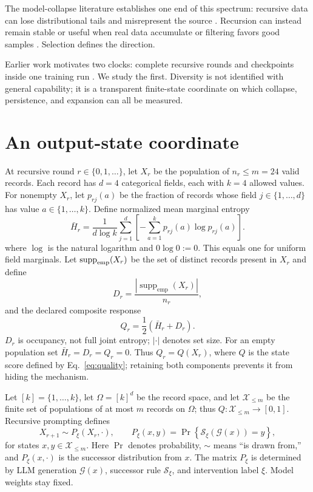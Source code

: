 \documentclass[10pt]{article}
\begin{document}
The model-collapse literature establishes one end of this spectrum: recursive data can lose distributional tails and misrepresent the source \cite{shumailov2024,alemohammad2024}. Recursion can instead remain stable or useful when real data accumulate or filtering favors good samples \cite{kazdan2025}. Selection defines the direction.

Earlier work motivates two clocks: complete recursive rounds and checkpoints inside one training run \cite{landersTakeoff,landersModal}. We study the first. Diversity is not identified with general capability; it is a transparent finite-state coordinate on which collapse, persistence, and expansion can all be measured.

\section{An output-state coordinate}

At recursive round $r\in\{0,1,\ldots\}$, let $X_r$ be the population of $n_r\le m=24$ valid records. Each record has $d=4$ categorical fields, each with $k=4$ allowed values. For nonempty $X_r$, let $p_{rj}(a)$ be the fraction of records whose field $j\in\{1,\ldots,d\}$ has value $a\in\{1,\ldots,k\}$. Define normalized mean marginal entropy
\begin{equation}\label{eq:entropy}
\bar H_r=\frac{1}{d\log k}\sum_{j=1}^{d}
\left[-\sum_{a=1}^{k}p_{rj}(a)\log p_{rj}(a)\right].
\end{equation}
where $\log$ is the natural logarithm and $0\log0:=0$. This equals one for uniform field marginals. Let $\operatorname{supp}_{\rm emp}(X_r)$ be the set of distinct records present in $X_r$ and define
\begin{equation}\label{eq:distinct}
D_r=\frac{|\operatorname{supp}_{\mathrm{emp}}(X_r)|}{n_r},
\end{equation}
and the declared composite response
\begin{equation}\label{eq:quality}
Q_r=\frac{1}{2}(\bar H_r+D_r).
\end{equation}
$D_r$ is occupancy, not full joint entropy; $|\cdot|$ denotes set size. For an empty population set $\bar H_r=D_r=Q_r=0$. Thus $Q_r=Q(X_r)$, where $Q$ is the state score defined by Eq.~\eqref{eq:quality}; retaining both components prevents it from hiding the mechanism.

Let $[k]=\{1,\ldots,k\}$, let $\Omega=[k]^d$ be the record space, and let $\mathcal X_{\le m}$ be the finite set of populations of at most $m$ records on $\Omega$; thus $Q:\mathcal X_{\le m}\to[0,1]$. Recursive prompting defines
\begin{equation}\label{eq:transition}
X_{r+1}\sim P_\xi(X_r,\cdot),\qquad
P_\xi(x,y)=\Pr\!\left\{\mathcal S_\xi(\mathcal G(x))=y\right\},
\end{equation}
for states $x,y\in\mathcal X_{\le m}$. Here $\Pr$ denotes probability, $\sim$ means ``is drawn from,'' and $P_\xi(x,\cdot)$ is the successor distribution from $x$. The matrix $P_\xi$ is determined by LLM generation $\mathcal G(x)$, successor rule $\mathcal S_\xi$, and intervention label $\xi$. Model weights stay fixed.
\end{document}
